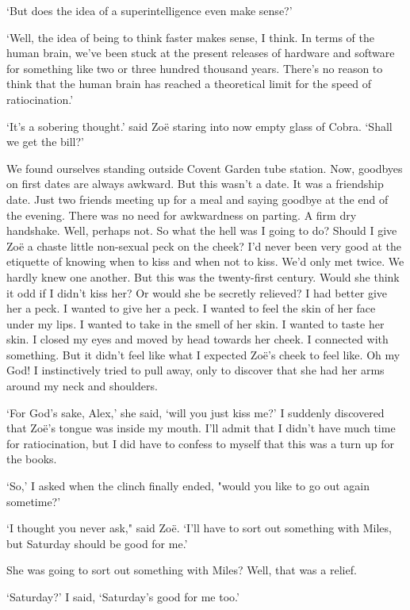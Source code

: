 `But does the idea of a superintelligence even make sense?'

`Well, the idea of being to think faster makes sense, I think. In
terms of the human brain, we've been stuck at the present releases
of hardware and software for something like two or three hundred
thousand years. There's no reason to think that the human brain has
reached a theoretical limit for the speed of ratiocination.'

`It's a sobering thought.' said Zo{\"e} staring into now
empty glass of Cobra. `Shall we get the bill?'

We found ourselves standing outside Covent Garden tube station. Now,
goodbyes on first dates are always awkward. But this wasn't a date.
It was a friendship date. Just two friends meeting up for a meal and
saying goodbye at the end of the evening. There was no need for
awkwardness on parting. A firm dry handshake. Well, perhaps not. So
what the hell was I going to do? Should I give Zo{\"e} a chaste
little non-sexual peck on the cheek? I'd never been very good at the
etiquette of knowing when to kiss and when not to kiss. We'd only
met twice. We hardly knew one another. But this was the twenty-first
century. Would she think it odd if I didn't kiss her? Or would she
be secretly relieved? I had better give her a peck. I {\twelveit
wanted\/} to give her a peck. I wanted to feel the skin of her face
under my lips. I wanted to take in the smell of her skin. I wanted
to taste her skin. I closed my eyes and moved by head towards her
cheek. I connected with something. But it didn't feel like what I
expected Zo{\"e}'s cheek to feel like. Oh my God! I instinctively
tried to pull away, only to discover that she had her arms around my
neck and shoulders.

`For God's sake, Alex,' she said, `will you just kiss me?' I
suddenly discovered that Zo{\"e}'s tongue was inside my mouth. I'll
admit that I didn't have much time for ratiocination, but I did have
to confess to myself that this was a turn up for the books.

`So,' I asked when the clinch finally ended, "would you like to go
out again sometime?'

`I thought you never ask," said Zo{\"e}. `I'll have to sort out
something with Miles, but Saturday should be good for me.'

She was going to sort out something with Miles? Well, that was a relief.

`Saturday?' I said, `Saturday's good for me too.'

